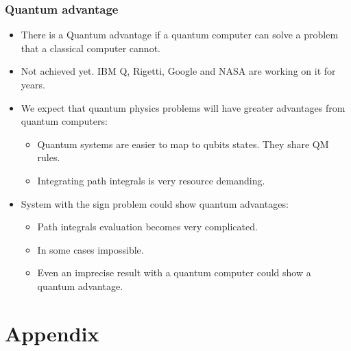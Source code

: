 \documentclass[10pt,t,xcolor=dvipsnames,aspectratio=169]{beamer}
\newlength\leftsidebar
\begin{document}
\begin{frame}
    \frametitle{Quantum advantage}
    \begin{itemize}
        \item
            There is a Quantum advantage if a quantum computer can solve a problem that a classical computer cannot.
        \item
            Not achieved yet. IBM Q, Rigetti, Google and NASA are working on it for years.
        \item
            We expect that quantum physics problems will have greater advantages from quantum computers:
            \begin{itemize}
                \item Quantum systems are easier to map to qubits states. They share QM rules.
                \item Integrating path integrals is very resource demanding.
            \end{itemize}
        \item
            System with the sign problem could show quantum advantages:
            \begin{itemize}
                \item Path integrals evaluation becomes very complicated.
                \item In some cases impossible.
                \item Even an imprecise result with a quantum computer could show a quantum advantage.
            \end{itemize}
    \end{itemize}
\end{frame}

\leftsidebar
{
\begin{frame}[plain,t]
\titlepage
\end{frame}
}
\hoffset=0in %

\section{Appendix}
\end{document}
